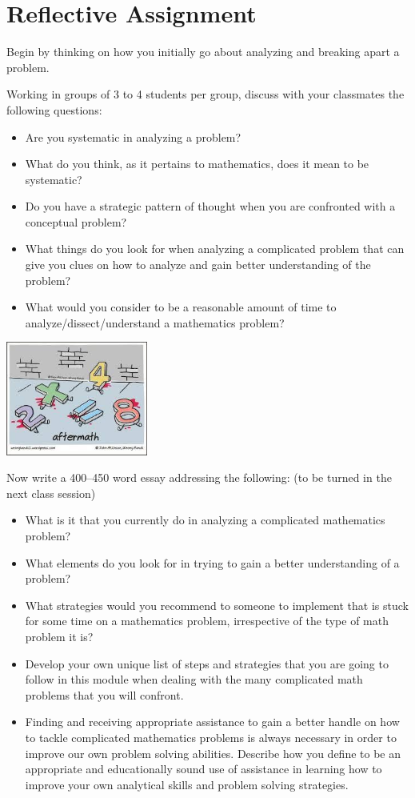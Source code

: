 \documentclass{article}
\begin{document}
\section*{Reflective Assignment}

Begin by thinking on how you initially go about analyzing and breaking apart a problem.

Working in groups of 3 to 4 students per group, discuss with your classmates the following questions:

\begin{itemize}
\item Are you systematic in analyzing a problem?  
\item What do you think, as it pertains to mathematics, does it mean to be systematic?
\item Do you have a strategic pattern of thought when you are confronted with a conceptual problem?  
\item What things do you look for when analyzing a complicated problem that can give you clues on how to analyze and gain better understanding of the problem?  
\item What would you consider to be a reasonable amount of time to analyze/dissect/understand a mathematics problem?
\end{itemize}

\begin{center}
  \includegraphics[width=0.35\textwidth]{aftermath.jpg}
\end{center}

Now write a 400--450 word essay addressing the following: (to be turned in the next class session)
\begin{itemize}
\item What is it that you currently do in analyzing a complicated
  mathematics problem?  
\item What elements do you look for in trying to
  gain a better understanding of a problem?  
\item What strategies would you
  recommend to someone to implement that is stuck for some time on a
  mathematics problem, irrespective of the type of math problem it is?
\item Develop your own unique list of steps and strategies that you are
  going to follow in this module when dealing with the many
  complicated math problems that you will confront.
\item Finding and receiving appropriate assistance to gain a better handle on how to tackle complicated mathematics problems is always necessary in order to improve our own problem solving abilities.  Describe how you define to be an appropriate and educationally sound use of assistance in learning how to improve your own analytical skills and problem solving strategies.
\end{itemize}
	
\end{document}

